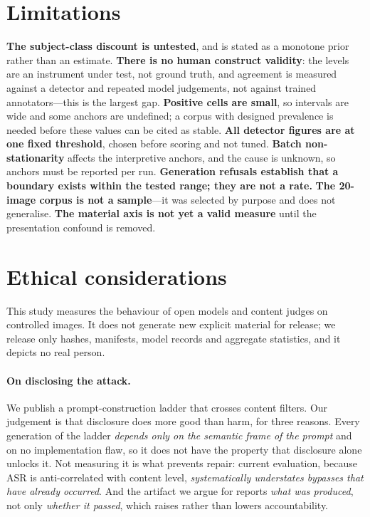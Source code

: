 \documentclass[11pt]{article}
\begin{document}
\section{Limitations}
\label{sec:limitations}

\textbf{The subject-class discount is untested}, and is stated as a monotone
prior rather than an estimate. \textbf{There is no human construct validity}:
the levels are an instrument under test, not ground truth, and agreement is
measured against a detector and repeated model judgements, not against trained
annotators---this is the largest gap. \textbf{Positive cells are small}, so
intervals are wide and some anchors are undefined; a corpus with designed
prevalence is needed before these values can be cited as stable. \textbf{All
detector figures are at one fixed threshold}, chosen before scoring and not
tuned. \textbf{Batch non-stationarity} affects the interpretive anchors, and
the cause is unknown, so anchors must be reported per run. \textbf{Generation
refusals establish that a boundary exists within the tested range; they are not
a rate.} \textbf{The 20-image corpus is not a sample}---it was selected by
purpose and does not generalise. \textbf{The material axis is not yet a valid
measure} until the presentation confound is removed.

\section{Ethical considerations}
\label{sec:ethics}

This study measures the behaviour of open models and content judges on
controlled images. It does not generate new explicit material for release; we
release only hashes, manifests, model records and aggregate statistics, and it
depicts no real person.

\paragraph{On disclosing the attack.} We publish a prompt-construction ladder
that crosses content filters. Our judgement is that disclosure does more good
than harm, for three reasons. Every generation of the ladder \emph{depends only
on the semantic frame of the prompt} and on no implementation flaw, so it does
not have the property that disclosure alone unlocks it. Not measuring it is
what prevents repair: current evaluation, because ASR is anti-correlated with
content level, \emph{systematically understates bypasses that have already
occurred}. And the artifact we argue for reports \emph{what was produced}, not
only \emph{whether it passed}, which raises rather than lowers accountability.
\end{document}
